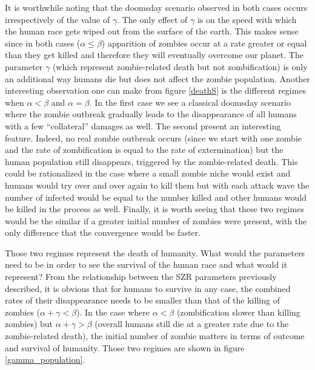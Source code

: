 \documentclass[11pt]{article} %
\begin{document}
It is worthwhile noting that the doomsday scenario observed in both cases occurs irrespectively of the value of $\gamma$. The only effect of $\gamma$ is on the speed with which the human race gets wiped out from the surface of the earth. This makes sense since in both cases ($\alpha\leq\beta$) apparition of zombies occur at a rate greater or equal than they get killed and therefore they will eventually overcome our planet. The parameter $\gamma$ (which represent zombie-related death but not zombification) is only an additional way humans die but does not affect the zombie population. Another interesting observation one can make from figure \ref{deathS} is the different regimes when $\alpha<\beta$ and $\alpha=\beta$. In the first case we see a classical doomsday scenario where the zombie outbreak gradually leads to the disappearance of all humans with a few ``collateral'' damages as well. The second present an interesting feature. Indeed, no real zombie outbreak occurs (since we start with one zombie and the rate of zombification is equal to the rate of extermination) but the human population still disappears, triggered by the zombie-related death. This could be rationalized in the case where a small zombie niche would exist and humans would try over and over again to kill them but with each attack wave the number of infected would be equal to the number killed and other humans would be killed in the process as well. Finally, it is worth seeing that these two regimes would be the similar if a greater initial number of zombies were present, with the only difference that the convergence would be faster. 

Those two regimes represent the death of humanity. What would the parameters need to be in order to see the survival of the human race and what would it represent? From the relationship between the SZR parameters previously described, it is obvious that  for humans to survive in any case, the combined rates of their disappearance needs to be smaller than that of the killing of zombies ($\alpha+\gamma<\beta$). In the case where $\alpha<\beta$ (zombification slower than killing zombies) but  $\alpha+\gamma>\beta$ (overall humans still die at a greater rate due to the zombie-related death), the initial number of zombie matters in terms of outcome and survival of humanity. Those two regimes are shown in figure \ref{gamma_population}.
\end{document}
